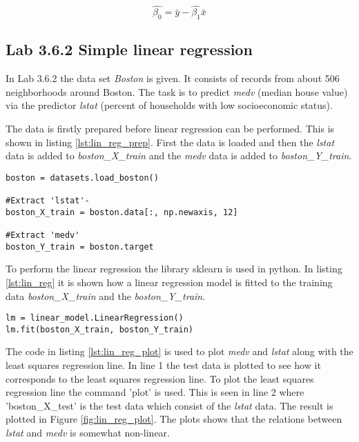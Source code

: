 \begin{equation}
\hat{\beta_0} = \bar{y} -\hat{\beta_1}\bar{x}
\end{equation}



\subsection{Lab 3.6.2 Simple linear regression}

In Lab 3.6.2 the data set \emph{Boston} is given. It consists of records from about 506 neighborhoods around Boston. The task is to predict \emph{medv} (median house value) via the predictor \emph{lstat} (percent of households with low socioeconomic status).

The data is firstly prepared before linear regression can be performed. This is shown in listing \ref{lst:lin_reg_prep}. First the data is loaded and then the \emph{lstat} data is added to \emph{boston\_X\_train} and the \emph{medv} data is added to \emph{boston\_Y\_train}.

\begin{lstlisting}[caption={Data preparation for linear regression}, label=lst:lin_reg_prep, mathescape=true]
boston = datasets.load_boston()

#Extract 'lstat'-
boston_X_train = boston.data[:, np.newaxis, 12]

#Extract 'medv'
boston_Y_train = boston.target
\end{lstlisting}

To perform the linear regression the library sklearn is used in python. In listing \ref{lst:lin_reg} it is shown how a linear regression model is fitted to the training data \emph{boston\_X\_train} and the \emph{boston\_Y\_train}.

\begin{lstlisting}[caption={Python Linear Regression function}, label=lst:lin_reg, mathescape=true]
lm = linear_model.LinearRegression()
lm.fit(boston_X_train, boston_Y_train)
\end{lstlisting}

\FloatBarrier

The code in listing \ref{lst:lin_reg_plot} is used to plot \emph{medv} and \emph{lstat} along with the least squares regression line. In line 1 the test data is plotted to see how it corresponds to the least squares regression line. To plot the least squares regression line the command 'plot' is used. This is seen in line 2 where 'boston\_X\_test' is the test data which consist of the \emph{lstat} data. The result is plotted in Figure \ref{fig:lin_reg_plot}. The plots shows that the relations between \emph{lstat} and \emph{medv} is somewhat non-linear. 

